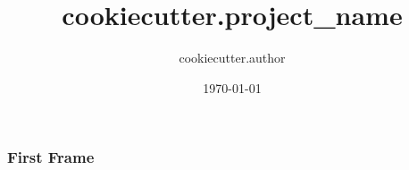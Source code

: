 \documentclass[10pt, t]{beamer}
\title{ {{cookiecutter.project_name}} }
\author{ {{cookiecutter.author}} }
\date{\today}
\begin{document}
\AddToShipoutPicture{\TitlePicture}
\maketitle

\ClearShipoutPicture
\AddToShipoutPicture{\BackgroundPicture}

\begin{frame}
	\frametitle{First Frame}
\end{frame}


\begin{acronym}
\end{acronym}
\end{document}
